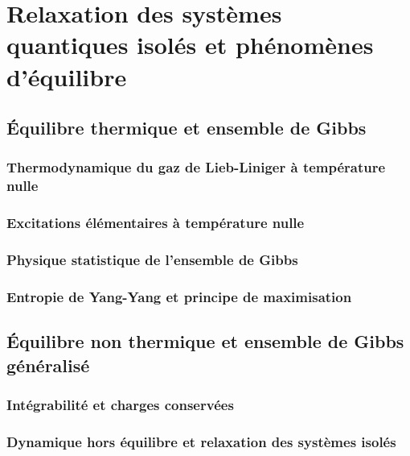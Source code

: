 \chapter{Relaxation des systèmes quantiques isolés et phénomènes d'équilibre}
\minitoc
\section{Équilibre thermique et ensemble de Gibbs}

\subsection{Thermodynamique du gaz de Lieb-Liniger à température nulle}


\subsection{Excitations élémentaires à température nulle}
\subsection{Physique statistique de l’ensemble de Gibbs}


\subsection{Entropie de Yang-Yang et principe de maximisation}

\section{Équilibre non thermique et ensemble de Gibbs généralisé}

\subsection{Intégrabilité et charges conservées}
\subsection{Dynamique hors équilibre et relaxation des systèmes isolés}
